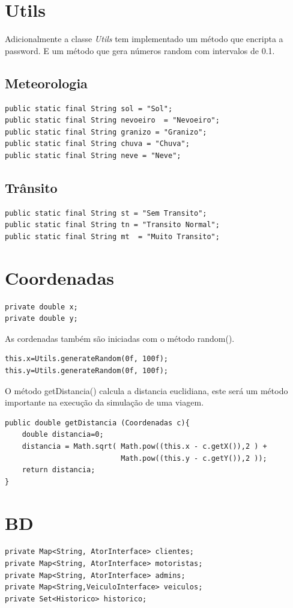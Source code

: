 \section{Utils}
Adicionalmente a classe \textit{Utils} tem implementado um método que encripta a password. E um método que gera números random com intervalos de 0.1. 

\subsection{Meteorologia}
\begin{verbatim}
public static final String sol = "Sol"; 
public static final String nevoeiro  = "Nevoeiro"; 
public static final String granizo = "Granizo";
public static final String chuva = "Chuva";
public static final String neve = "Neve"; 
\end{verbatim}

\subsection{Trânsito}
\begin{verbatim}
public static final String st = "Sem Transito"; 
public static final String tn = "Transito Normal"; 
public static final String mt  = "Muito Transito"; 
\end{verbatim}

\section{Coordenadas}
\begin{verbatim}
private double x;
private double y;
\end{verbatim}

As cordenadas também são iniciadas com o método random(). 
\begin{verbatim}
this.x=Utils.generateRandom(0f, 100f);
this.y=Utils.generateRandom(0f, 100f);
\end{verbatim}

O método getDistancia() calcula a distancia euclidiana, este será um método importante na execução da simulação de uma viagem. 
\begin{verbatim}
public double getDistancia (Coordenadas c){
    double distancia=0; 
    distancia = Math.sqrt( Math.pow((this.x - c.getX()),2 ) +
                           Math.pow((this.y - c.getY()),2 ));
    return distancia; 
}
\end{verbatim}

\section{BD}
\begin{verbatim}
private Map<String, AtorInterface> clientes;
private Map<String, AtorInterface> motoristas; 
private Map<String, AtorInterface> admins; 
private Map<String,VeiculoInterface> veiculos; 
private Set<Historico> historico;
\end{verbatim}

